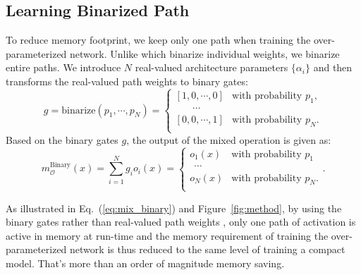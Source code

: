 \documentclass{article} \usepackage{iclr2019_conference,times}
\begin{document}
\subsection{Learning Binarized Path}
\label{sec:binarized_path_learning}
To reduce memory footprint, we keep only one path when training the over-parameterized network. Unlike \citet{courbariaux2015binaryconnect} which binarize individual weights, we binarize entire paths. We introduce $N$ real-valued architecture parameters $\{\alpha_i\}$ and then transforms the real-valued path weights to binary gates: 
\begin{equation}
\label{eq:gates}
    g = \text{binarize}(p_1, \cdots, p_N) = 
    \begin{cases}
        [1, 0, \cdots, 0] & \text{with probability $p_1$}, \\
        ~~~~~~~~\cdots \\
        [0, 0, \cdots, 1] & \text{with probability $p_N$}. \\
    \end{cases}
\end{equation}
Based on the binary gates $g$, the output of the mixed operation is given as:
\begin{equation}
\label{eq:mix_binary}
    m_\mathcal{O}^{\text{Binary}}(x) = \sum_{i=1}^N g_i o_i(x) = 
    \begin{cases}
    o_1(x) & \text{with probability $p_1$} \\
    ~~\cdots \\
    o_N(x) & \text{with probability $p_N$}. \\
    \end{cases}
    .
\end{equation}

As illustrated in Eq.~(\ref{eq:mix_binary}) and Figure~\ref{fig:method}, by using the binary gates rather than real-valued path weights \citep{liu2018darts}, only one path of activation is active in memory at run-time and the memory requirement of training the over-parameterized network is thus reduced to the same level of training a compact model. That's more than an order of magnitude memory saving. 
\end{document}
